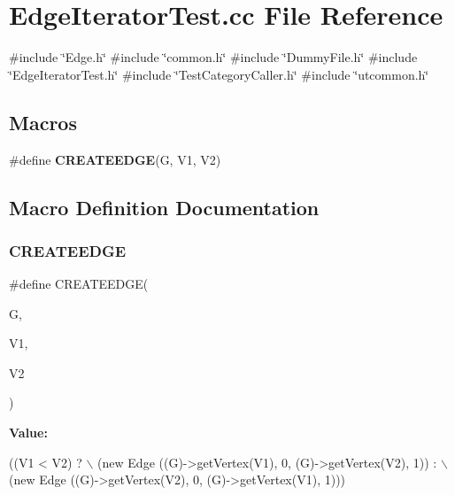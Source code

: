 \section{Edge\+Iterator\+Test.\+cc File Reference}
\label{EdgeIteratorTest_8cc}
{\ttfamily \#include \char`\"{}Edge.\+h\char`\"{}}\newline
{\ttfamily \#include \char`\"{}common.\+h\char`\"{}}\newline
{\ttfamily \#include \char`\"{}Dummy\+File.\+h\char`\"{}}\newline
{\ttfamily \#include \char`\"{}Edge\+Iterator\+Test.\+h\char`\"{}}\newline
{\ttfamily \#include \char`\"{}Test\+Category\+Caller.\+h\char`\"{}}\newline
{\ttfamily \#include \char`\"{}utcommon.\+h\char`\"{}}\newline
\subsection*{Macros}
\begin{DoxyCompactItemize}
\item 
\#define \textbf{ C\+R\+E\+A\+T\+E\+E\+D\+GE}(G,  V1,  V2)
\end{DoxyCompactItemize}


\subsection{Macro Definition Documentation}
\mbox{\label{EdgeIteratorTest_8cc_a52ddf6d2de5e99f66a5609f59b8f13fd}} 
\subsubsection{C\+R\+E\+A\+T\+E\+E\+D\+GE}
{\footnotesize\ttfamily \#define C\+R\+E\+A\+T\+E\+E\+D\+GE(\begin{DoxyParamCaption}\item[{}]{G,  }\item[{}]{V1,  }\item[{}]{V2 }\end{DoxyParamCaption})}

{\bfseries Value\+:}
\begin{DoxyCode}
((V1 < V2) ? \(\backslash\)
                (\textcolor{keyword}{new} Edge ((G)->getVertex(V1), 0, (G)->getVertex(V2), 1)) : \(\backslash\)
                (\textcolor{keyword}{new} Edge ((G)->getVertex(V2), 0, (G)->getVertex(V1), 1)))
\end{DoxyCode}
